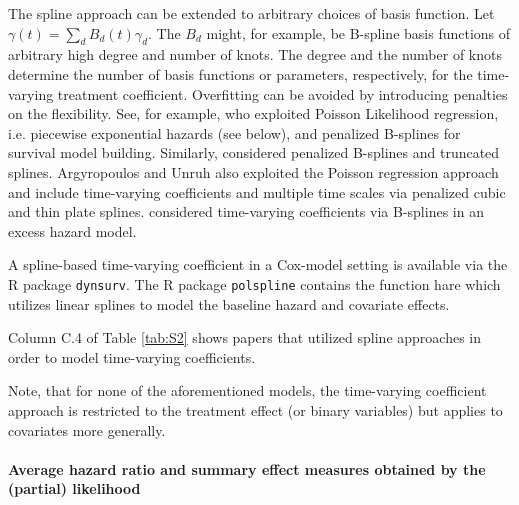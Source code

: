 \noindent The spline approach can be extended to arbitrary choices of basis function. Let $\gamma \left(t\right)=\sum_d{B_d\left(t\right){\gamma }_d}$. The $B_d$ might, for example, be B-spline basis functions of arbitrary high degree and number of knots. The degree and the number of knots determine the number of basis functions or parameters, respectively, for the time-varying treatment coefficient. Overfitting can be avoided by introducing penalties on the flexibility. See, for example, \cite{RodriguezGirondo.2013} who exploited Poisson Likelihood regression, i.e. piecewise exponential hazards (see below), and penalized B-splines for survival model building. Similarly, \cite{Brown.2007} considered penalized B-splines and truncated splines. 
Argyropoulos and Unruh \cite{Argyropoulos.2015} also exploited the Poisson regression approach and include time-varying coefficients and multiple time scales via penalized cubic and thin plate splines. \cite{Giorgi.2003} considered time-varying coefficients via B-splines in an excess hazard model.

\noindent 


\noindent A spline-based time-varying coefficient in a Cox-model setting is available via the R package \texttt{dynsurv}. The R package \texttt{polspline} contains the function hare which utilizes linear splines to model the baseline hazard and covariate effects.

\noindent 

\noindent Column C.4 of Table \ref{tab:S2} shows papers that utilized spline approaches in order to model time-varying coefficients.

\noindent 

\noindent Note, that for none of the aforementioned models, the time-varying coefficient approach is restricted to the treatment effect (or binary variables) but applies to covariates more generally.

\noindent 


\paragraph{Average hazard ratio and summary effect measures obtained by the  (partial) likelihood} \label{aHR}

\noindent 


